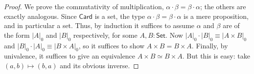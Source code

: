 \documentclass[10pt,a4paper]{article}
\newcommand{\jdeq}{\equiv}      %
\newcommand{\eqvsym}{\simeq}    %
\renewcommand{\set}{\ensuremath{\mathsf{Set}}\xspace}
\newcommand{\card}{\ensuremath{\mathsf{Card}}\xspace}
\newcommand{\tproj}[3][]{\mathopen{}\left|#3\right|_{#2}^{#1}\mathclose{}}
\def\cd{\tproj0}
\theoremstyle{definition}
\theoremstyle{remark}
\numberwithin{equation}{section}
\begin{document}
\begin{proof}
  We prove the commutativity of multiplication, $\alpha\cdot\beta = \beta\cdot\alpha$; the others are exactly analogous.
  Since \card is a set, the type $\alpha\cdot\beta = \beta\cdot\alpha$ is a mere proposition, and in particular a set.
  Thus, by induction it suffices to assume $\alpha$ and $\beta$ are of the form $\cd{A}$ and $\cd{B}$ respectively, for some $A,B:\set$.
  Now $\cd{A}\cdot \cd{B} \jdeq \cd{A\times B}$ and $\cd{B}\cdot\cd{A} \jdeq \cd{B\times A}$, so it suffices to show $A\times B = B\times A$.
  Finally, by univalence, it suffices to give an equivalence $A\times B \eqvsym B\times A$.
  But this is easy: take $(a,b) \mapsto (b,a)$ and its obvious inverse.
\end{proof}
\end{document}
